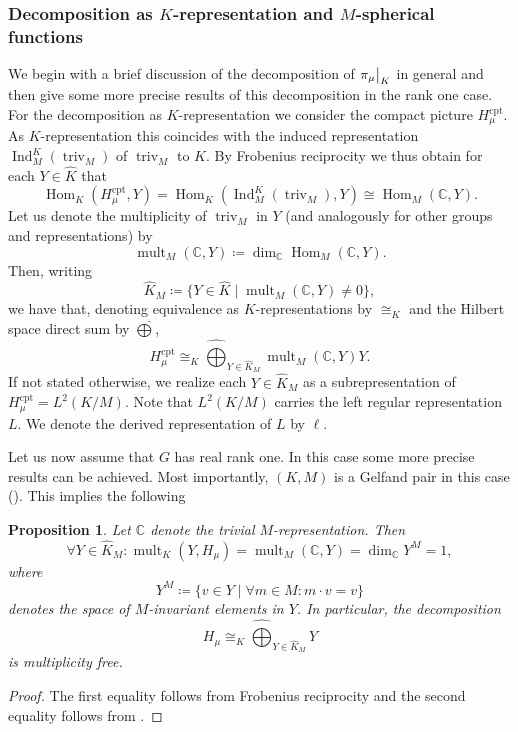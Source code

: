 \documentclass[JEP,XML,SOM,NoFloatCountersInSection,Unicode,published]{cedram}
\let\cdotm\cdot
\newtheorem{proposition}[theorem]{Proposition}
\theoremstyle{definition}
\newcommand\restr[2]{{
\left.\kern-\nulldelimiterspace
#1
\vphantom{\big|}
\right|_{#2}
}}
\newcommand{\on}[1]{\ensuremath{\operatorname{#1}}}
\newcommand{\Hom}[3]{\ensuremath{\on{Hom}_{#1}(#2,#3)}}
\newcommand{\C}{\ensuremath{\mathbb{C}}}
\newcommand{\psc}[2]{\ensuremath{H_{#2}^{\mathrm{cpt}}}}
\newcommand{\pst}[1]{\ensuremath{H_{#1}}}
\begin{document}
\subsubsection*{Decomposition as \texorpdfstring{$K$}{K}-representation and \texorpdfstring{$M$}{M}-spherical functions} We begin with a brief discussion of the decomposition of $\restr{\pi_{\mu}}{K}$ in general and then give some more precise results of this decomposition in the rank one case. For the decomposition as $K$-representation we consider the compact picture $\psc{\sigma}{\mu}$. As $K$-representation this coincides with the induced representation $\on{Ind}_M^K(\on{triv}_M)$ of $\on{triv}_M$ to $K$. By Frobenius reciprocity we thus obtain for each $Y\in\hat K$ that
\[
\Hom{K}{\psc{\sigma}{\mu}}{Y}=\Hom{K}{\on{Ind}_M^K(\on{triv}_M)}{Y}\cong\Hom{M}{\C}{Y}.
\]
Let us denote the multiplicity of $\on{triv}_M$ in $Y$ (and analogously for other groups and representations) by
\[
\on{mult}_M(\C,Y)\coloneqq\dim_\C\Hom{M}{\C}{Y}.
\]
Then, writing
\[
\hat K_M\coloneqq\{Y\in\hat K\mid\on{mult}_M(\C,Y)\neq0\},
\]
we have that, denoting equivalence as $K$-representations by $\cong_K$ and the Hilbert space direct sum by $\widehat\bigoplus$,
\[
\psc{\sigma}{\mu}\cong_K\widehat\bigoplus_{Y\in\hat K_{M}}\on{mult}_M(\C,Y)Y.
\]
If not stated otherwise, we realize each $Y\in\hat K_M$ as a subrepresentation of $\psc{\sigma}{\mu}=L^2(K/M)$\label{realization_K}. Note that $L^2(K/M)$ carries the left regular representation $L$. We denote the derived representation of $L$ by $\ell$.

Let us now assume that $G$ has real rank one. In this case some more precise results can be achieved. Most importantly, $(K,M)$ is a Gelfand pair in this case (\cf \cite[Ch.\,II, \S 6, Cor.\,6.8]{GASS}). This implies the following

\begin{proposition}\label{prop:multone}
Let $\C$ denote the trivial $M$-representation. Then
\begin{equation}\label{eq:multone}
\forall Y\in\hat K_M\colon\on{mult}_K(Y,\pst{\mu})=\on{mult}_M(\C,Y)=\dim_\C Y^M=1,
\end{equation}
where
\[
Y^M\coloneqq\{v\in Y\mid\forall m\in M\colon m\cdotm v=v\}
\]
denotes the space of $M$-invariant elements in $Y$. In particular, the decomposition
\[
\pst{\mu}\cong_K\widehat\bigoplus_{Y\in\hat K_M}Y
\]
is multiplicity free.
\end{proposition}
\begin{proof}
The first equality follows from Frobenius reciprocity and the second equality follows from \cite[Ch.\,V, Th.\,3.5(iv)]{GAGA}.
\end{proof}
\end{document}
